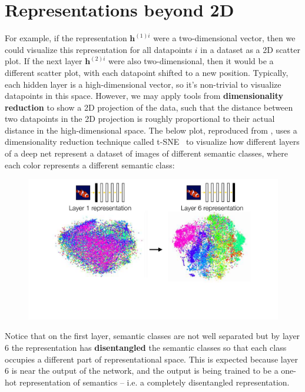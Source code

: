 \section{Representations beyond 2D}
For example, if the representation $\mathbf{h}^{(1)i}$ were a two-dimensional vector, then we could visualize this representation for all datapoints $i$ in a dataset as a 2D scatter plot. If the next layer $\mathbf{h}^{(2)i}$ were also two-dimensional, then it would be a different scatter plot, with each datapoint shifted to a new position. Typically, each hidden layer is a high-dimensional vector, so it's non-trivial to visualize datapoints in this space. However, we may apply tools from {\bf dimensionality reduction} to show a 2D projection of the data, such that the distance between two datapoints in the 2D projection is roughly proportional to their actual distance in the high-dimensional space. The below plot, reproduced from \cite{decaf}, uses a dimensionality reduction technique called t-SNE~\cite{tsne} to visualize how different layers of a deep net represent a dataset of images of different semantic classes, where each color represents a different semantic class:

\begin{figure}[h]
    \centering
    \includegraphics[width=0.6\linewidth]{./figures/neural_nets/decaf_tsne.pdf}
    \label{fig:decaf_tsne}
\end{figure}

Notice that on the first layer, semantic classes are not well separated but by layer 6 the representation has {\bf disentangled} the semantic classes so that each class occupies a different part of representational space. This is expected because layer 6 is near the output of the network, and the output is being trained to be a one-hot representation of semantics -- i.e. a completely disentangled representation.
